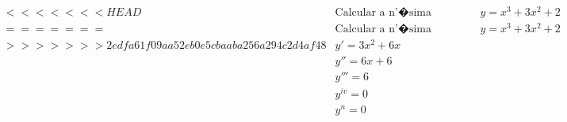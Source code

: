 \begin{ex}
\begin{align}
<<<<<<< HEAD
&\text{Calcular a n'�sima derivada de}\quad y=x^3+3x^2+2\nonumber\\
=======
&\text{Calcular a n'�sima derivada de}\quad y=x^3+3x^2+2\nonumber\\
>>>>>>> 2edfa61f09aa52eb0e5cbaaba256a294c2d4af48
&y'=3x^2+6x\nonumber\\
&y''=6x+6\nonumber\\
&y'''=6\nonumber\\
&y^{iv}=0\nonumber\\
&y^{n}=0\nonumber
\end{align}
\end{ex}